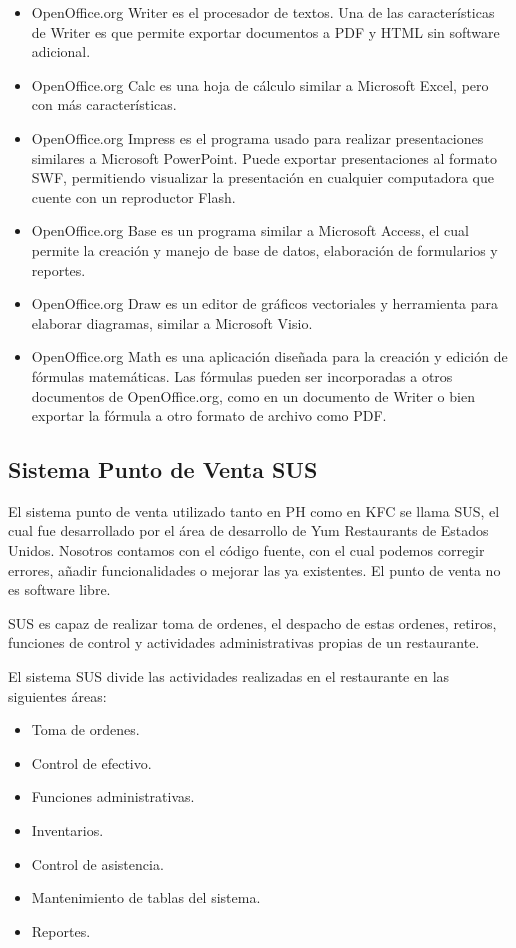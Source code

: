\begin{itemize}
 \item OpenOffice.org Writer es el procesador de textos. Una de las características de Writer es que permite exportar documentos a PDF y HTML sin software adicional.
 \item OpenOffice.org Calc es una hoja de cálculo similar a Microsoft Excel, pero con más características.
 \item OpenOffice.org Impress es el programa usado para realizar presentaciones similares a Microsoft PowerPoint. Puede exportar presentaciones al formato SWF, permitiendo visualizar la presentación en cualquier computadora que cuente con un reproductor Flash.
 \item OpenOffice.org Base es un programa similar a Microsoft Access, el cual permite la creación y manejo de base de datos, elaboración de formularios y reportes.
 \item OpenOffice.org Draw es un editor de gráficos vectoriales y herramienta para elaborar diagramas, similar a Microsoft Visio.
 \item OpenOffice.org Math es una aplicación diseñada para la creación y edición de fórmulas matemáticas. Las fórmulas pueden ser incorporadas a otros documentos de OpenOffice.org, como en un documento de Writer o bien exportar la fórmula a otro formato de archivo como PDF.
\end{itemize}

\subsection{Sistema Punto de Venta SUS}
\label{sec:sus}

El sistema punto de venta utilizado tanto en PH como en KFC se llama SUS, el cual fue desarrollado por el área de desarrollo de Yum Restaurants de Estados Unidos. Nosotros contamos con el código fuente, con el cual podemos corregir errores, añadir funcionalidades o mejorar las ya existentes. El punto de venta no es software libre.

SUS es capaz de realizar toma de ordenes, el despacho de estas ordenes, retiros, funciones de control y actividades administrativas propias de un restaurante.

El sistema SUS divide las actividades realizadas en el restaurante en las siguientes áreas:

\begin{itemize}
 \item Toma de ordenes.
 \item Control de efectivo.
 \item Funciones administrativas.
 \item Inventarios.
 \item Control de asistencia.
 \item Mantenimiento de tablas del sistema.
 \item Reportes.
\end{itemize}

